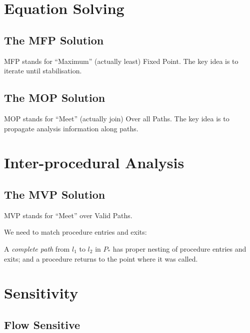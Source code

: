 \section{Equation Solving}

\subsection{The MFP Solution}

MFP stands for ``Maximum'' (actually least) Fixed Point.  The key idea
is to iterate until stabilisation.





\subsection{The MOP Solution}

MOP stands for ``Meet'' (actually join) Over all Paths.  The key idea
is to propagate analysis information along paths.



\section{Inter-procedural Analysis}


\subsection{The MVP Solution}

MVP stands for ``Meet'' over Valid Paths.

We need to match procedure entries and exits:

A \textit{complete path} from $l_1$ to $l_2$ in $P_*$ has proper
nesting of procedure entries and exits; and a procedure returns to the
point where it was called.



\section{Sensitivity}
\label{sec:sensitivity}

\subsection{Flow Sensitive}
\label{sec:flow-sensitive}

